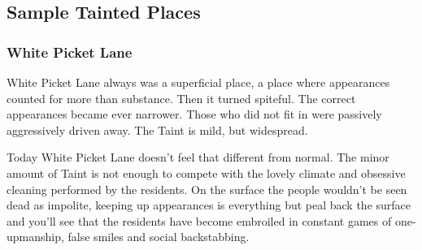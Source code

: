                                                                                                                                                                                                                                                                                                                                                                                                                                                     

\subsection*{Sample Tainted Places}

\subsubsection*{White Picket Lane}

White Picket Lane always was a superficial place, a place where appearances counted for more than substance. Then it turned spiteful. The correct appearances became ever narrower. Those who did not fit in were passively aggressively driven away. The Taint is mild, but widespread.

Today White Picket Lane doesn’t feel that different from normal. The minor amount of Taint is not enough to compete with the lovely climate and obsessive cleaning performed by the residents. On the surface the people wouldn't be seen dead as impolite, keeping up appearances is everything but peal back the surface and you'll see that the residents have become embroiled in constant games of one-upmanship, false smiles and social backstabbing.\\

